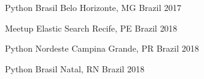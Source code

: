 


\begin{cvhonors}


\cvhonor
{Python Brasil} %
{Belo Horizonte, MG} %
{Brazil} %
{2017} %
    

\cvhonor
{Meetup Elastic Search} %
{Recife, PE} %
{Brazil} %
{2018} %
    

\cvhonor
{Python Nordeste} %
{Campina Grande, PR} %
{Brazil} %
{2018} %


\cvhonor
{Python Brasil} %
{Natal, RN} %
{Brazil} %
{2018} %


\end{cvhonors}